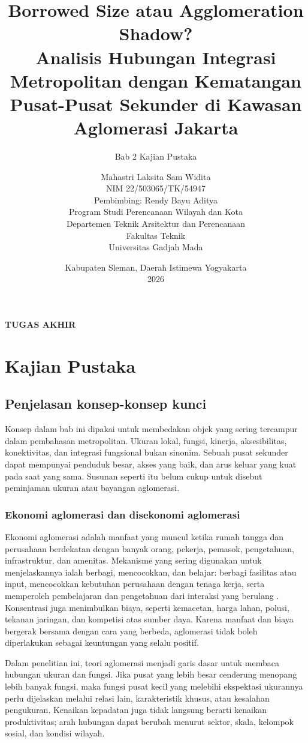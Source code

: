 \documentclass[11pt,a4paper,oneside,openany,indonesian]{report}
\title{\textbf{Borrowed Size atau Agglomeration Shadow?}\\[0.4em]
Analisis Hubungan Integrasi Metropolitan dengan Kematangan Pusat-Pusat Sekunder di Kawasan Aglomerasi Jakarta}
\subtitle{Bab 2 Kajian Pustaka}
\author{Mahastri Laksita Sam Widita\\NIM 22/503065/TK/54947\\[0.5em]
Pembimbing: Rendy Bayu Aditya\\[0.5em]
Program Studi Perencanaan Wilayah dan Kota\\
Departemen Teknik Arsitektur dan Perencanaan\\
Fakultas Teknik\\
Universitas Gadjah Mada}
\date{Kabupaten Sleman, Daerah Istimewa Yogyakarta\\2026}
\makeatletter
\renewcommand{\maketitle}{%
  \begin{titlepage}
    \centering
    {\Large\bfseries TUGAS AKHIR\par}
    \vfill
    {\LARGE\bfseries \@title\par}
    \vspace{1.2cm}
    {\large \thesubtitle\par}
    \vfill
    {\large \@author\par}
    \vfill
    {\large \@date\par}
  \end{titlepage}}
\makeatother
\begin{document}
\maketitle
\tableofcontents
\clearpage
\setcounter{chapter}{1}
\chapter{Kajian Pustaka}

\section{Penjelasan konsep-konsep kunci}

Konsep dalam bab ini dipakai untuk membedakan objek yang sering tercampur dalam pembahasan metropolitan. Ukuran lokal, fungsi, kinerja, aksesibilitas, konektivitas, dan integrasi fungsional bukan sinonim. Sebuah pusat sekunder dapat mempunyai penduduk besar, akses yang baik, dan arus keluar yang kuat pada saat yang sama. Susunan seperti itu belum cukup untuk disebut peminjaman ukuran atau bayangan aglomerasi.

\subsection{Ekonomi aglomerasi dan disekonomi aglomerasi}

Ekonomi aglomerasi adalah manfaat yang muncul ketika rumah tangga dan perusahaan berdekatan dengan banyak orang, pekerja, pemasok, pengetahuan, infrastruktur, dan amenitas. Mekanisme yang sering digunakan untuk menjelaskannya ialah berbagi, mencocokkan, dan belajar: berbagi fasilitas atau input, mencocokkan kebutuhan perusahaan dengan tenaga kerja, serta memperoleh pembelajaran dan pengetahuan dari interaksi yang berulang \parencite{durantonpuga2004}. Konsentrasi juga menimbulkan biaya, seperti kemacetan, harga lahan, polusi, tekanan jaringan, dan kompetisi atas sumber daya. Karena manfaat dan biaya bergerak bersama dengan cara yang berbeda, aglomerasi tidak boleh diperlakukan sebagai keuntungan yang selalu positif.

Dalam penelitian ini, teori aglomerasi menjadi garis dasar untuk membaca hubungan ukuran dan fungsi. Jika pusat yang lebih besar cenderung menopang lebih banyak fungsi, maka fungsi pusat kecil yang melebihi ekspektasi ukurannya perlu dijelaskan melalui relasi lain, karakteristik khusus, atau kesalahan pengukuran. Kenaikan kepadatan juga tidak langsung berarti kenaikan produktivitas; arah hubungan dapat berubah menurut sektor, skala, kelompok sosial, dan kondisi wilayah.
\end{document}
